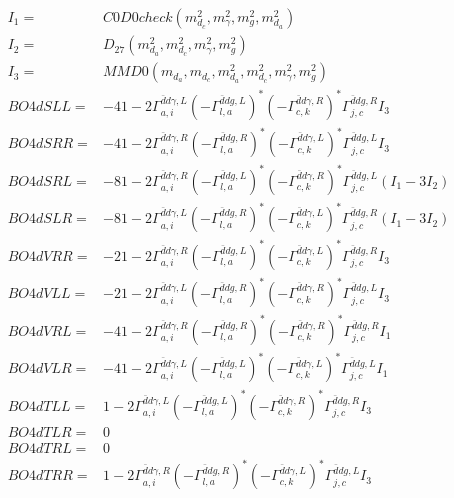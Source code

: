 \documentclass[A4,landscape]{article}
\begin{document}
\begin{align} 
I_1 = & C0D0check(m^2_{d_{{c}}}, m^2_{\gamma}, m^2_{g}, m^2_{d_{{a}}}) \\ 
I_2 = & D_{27}(m^2_{d_{{a}}}, m^2_{d_{{c}}}, m^2_{\gamma}, m^2_{g}) \\ 
I_3 = & MMD0(m_{d_{{a}}}, m_{d_{{c}}}, m^2_{d_{{a}}}, m^2_{d_{{c}}}, m^2_{\gamma}, m^2_{g}) \\ 
  BO4dSLL= & -4 1
-
2 \Gamma^{\bar{d}d \gamma ,L}_{a, i} (- \Gamma^{\bar{d}d g ,L} _{l, a})^* (- \Gamma^{\bar{d}d \gamma ,R} _{c, k})^* \Gamma^{\bar{d}d g ,R}_{j, c} I_3 \\ 
  BO4dSRR= & -4 1
-
2 \Gamma^{\bar{d}d \gamma ,R}_{a, i} (- \Gamma^{\bar{d}d g ,R} _{l, a})^* (- \Gamma^{\bar{d}d \gamma ,L} _{c, k})^* \Gamma^{\bar{d}d g ,L}_{j, c} I_3 \\ 
  BO4dSRL= & -8 1
-
2 \Gamma^{\bar{d}d \gamma ,R}_{a, i} (- \Gamma^{\bar{d}d g ,L} _{l, a})^* (- \Gamma^{\bar{d}d \gamma ,R} _{c, k})^* \Gamma^{\bar{d}d g ,L}_{j, c} (I_1 - 3 I_2) \\ 
  BO4dSLR= & -8 1
-
2 \Gamma^{\bar{d}d \gamma ,L}_{a, i} (- \Gamma^{\bar{d}d g ,R} _{l, a})^* (- \Gamma^{\bar{d}d \gamma ,L} _{c, k})^* \Gamma^{\bar{d}d g ,R}_{j, c} (I_1 - 3 I_2) \\ 
  BO4dVRR= & -2 1
-
2 \Gamma^{\bar{d}d \gamma ,R}_{a, i} (- \Gamma^{\bar{d}d g ,L} _{l, a})^* (- \Gamma^{\bar{d}d \gamma ,L} _{c, k})^* \Gamma^{\bar{d}d g ,R}_{j, c} I_3 \\ 
  BO4dVLL= & -2 1
-
2 \Gamma^{\bar{d}d \gamma ,L}_{a, i} (- \Gamma^{\bar{d}d g ,R} _{l, a})^* (- \Gamma^{\bar{d}d \gamma ,R} _{c, k})^* \Gamma^{\bar{d}d g ,L}_{j, c} I_3 \\ 
  BO4dVRL= & -4 1
-
2 \Gamma^{\bar{d}d \gamma ,R}_{a, i} (- \Gamma^{\bar{d}d g ,R} _{l, a})^* (- \Gamma^{\bar{d}d \gamma ,R} _{c, k})^* \Gamma^{\bar{d}d g ,R}_{j, c} I_1 \\ 
  BO4dVLR= & -4 1
-
2 \Gamma^{\bar{d}d \gamma ,L}_{a, i} (- \Gamma^{\bar{d}d g ,L} _{l, a})^* (- \Gamma^{\bar{d}d \gamma ,L} _{c, k})^* \Gamma^{\bar{d}d g ,L}_{j, c} I_1 \\ 
  BO4dTLL= & 1
-
2 \Gamma^{\bar{d}d \gamma ,L}_{a, i} (- \Gamma^{\bar{d}d g ,L} _{l, a})^* (- \Gamma^{\bar{d}d \gamma ,R} _{c, k})^* \Gamma^{\bar{d}d g ,R}_{j, c} I_3 \\ 
  BO4dTLR= & 0 \\ 
  BO4dTRL= & 0 \\ 
  BO4dTRR= & 1
-
2 \Gamma^{\bar{d}d \gamma ,R}_{a, i} (- \Gamma^{\bar{d}d g ,R} _{l, a})^* (- \Gamma^{\bar{d}d \gamma ,L} _{c, k})^* \Gamma^{\bar{d}d g ,L}_{j, c} I_3 \\ 
\end{align} 
\end{document}
